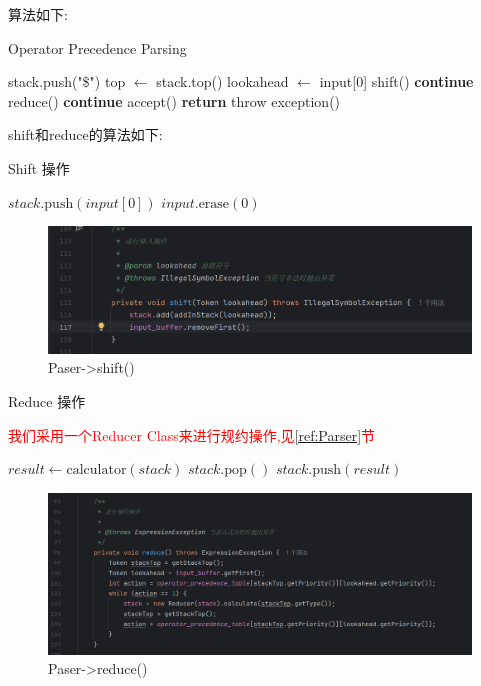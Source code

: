 \documentclass{article}
\begin{document}
算法如下:
\begin{algorithm}[H]
    \caption{Operator Precedence Parsing}
    \begin{algorithmic}[1]
        \State stack.push("\$")
        \State top $\gets$ stack.top()
        \State lookahead $\gets$ input[0]
        \State shift()
        \State \textbf{continue}
        \State reduce()
        \State \textbf{continue}
        \State accept()
        \State \textbf{return}
        \State throw exception()
        \EndIf
        \EndWhile
    \end{algorithmic}
\end{algorithm}
\newpage
\noindent
shift和reduce的算法如下:
\begin{algorithm}[H]
    \small
    \caption{Shift 操作}
    \begin{algorithmic}[1]
        \State $stack.\text{push}(input[0])$
        \State $input.\text{erase}(0)$
        \EndFunction
    \end{algorithmic}
\end{algorithm}
\begin{figure}[H]
    \centering
    \includegraphics[width=0.6\linewidth]{shift.png}
    \caption{Paser->shift()}
    \label{fig:shift}
\end{figure}
\begin{algorithm}[H]
    \small
    \caption{Reduce 操作}
    \textcolor{red}{我们采用一个Reducer Class来进行规约操作,见\ref{ref:Parser}节}
    \begin{algorithmic}[1]
        \State $result \gets \text{calculator}(stack)$
        \State $stack.\text{pop}()$
        \State $stack.\text{push}(result)$
        \EndWhile
        \EndFunction
    \end{algorithmic}
\end{algorithm}
\begin{figure}[H]
    \centering
    \includegraphics[width=0.6\linewidth]{reduce1.png}
    \caption{Paser->reduce()}
    \label{fig:reduce1}
\end{figure}
\end{document}
